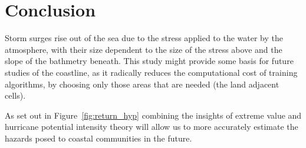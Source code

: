 \section{Conclusion}
\label{sec:8_Conclusion}

Storm surges rise out of the sea due to the stress applied to the water by
the atmosphere, with their size dependent to the size of the stress above and
the slope of the bathmetry beneath. This study might provide some basis for
future studies of the coastline, as it radically reduces the computational cost
of training algorithms, by choosing only those areas that are needed (the
land adjacent cells).

As set out in Figure~\ref{fig:return_hyp} combining the insights of
extreme value and hurricane potential intensity theory will allow
us to more accurately estimate the hazards posed to coastal communities
in the future.
